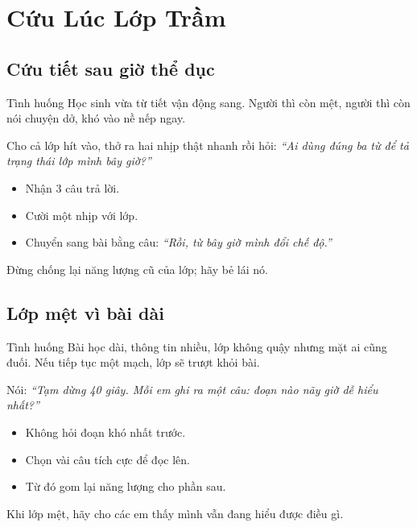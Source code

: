 \chapter{Cứu Lúc Lớp Trầm}

\section{Cứu tiết sau giờ thể dục}
\begin{tinhhuong}{Tình huống}
Học sinh vừa từ tiết vận động sang. Người thì còn mệt, người thì còn nói chuyện dở, khó vào nề nếp ngay.
\end{tinhhuong}
\begin{goiydungngay}
Cho cả lớp hít vào, thở ra hai nhịp thật nhanh rồi hỏi: \textit{``Ai dùng đúng ba từ để tả trạng thái lớp mình bây giờ?''}
\begin{itemize}
\item Nhận 3 câu trả lời.
\item Cười một nhịp với lớp.
\item Chuyển sang bài bằng câu: \textit{``Rồi, từ bây giờ mình đổi chế độ.''}
\end{itemize}
\end{goiydungngay}
\begin{cauchot}
Đừng chống lại năng lượng cũ của lớp; hãy bẻ lái nó.
\end{cauchot}
\ngancach

\section{Lớp mệt vì bài dài}
\begin{tinhhuong}{Tình huống}
Bài học dài, thông tin nhiều, lớp không quậy nhưng mặt ai cũng đuối. Nếu tiếp tục một mạch, lớp sẽ trượt khỏi bài.
\end{tinhhuong}
\begin{goiydungngay}
Nói: \textit{``Tạm dừng 40 giây. Mỗi em ghi ra một câu: đoạn nào nãy giờ dễ hiểu nhất?''}
\begin{itemize}
\item Không hỏi đoạn khó nhất trước.
\item Chọn vài câu tích cực để đọc lên.
\item Từ đó gom lại năng lượng cho phần sau.
\end{itemize}
\end{goiydungngay}
\begin{cauchot}
Khi lớp mệt, hãy cho các em thấy mình vẫn đang hiểu được điều gì.
\end{cauchot}
\ngancach

